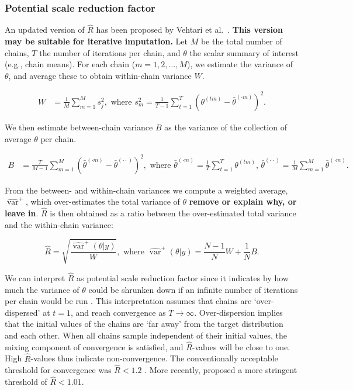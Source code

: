 \documentclass[Royal,times,sageh]{sagej}
\begin{document}
\hypertarget{potential-scale-reduction-factor}{%
\subsubsection{Potential scale reduction factor}\label{potential-scale-reduction-factor}}

An updated version of \(\widehat{R}\) has been proposed by Vehtari et al.~\citeyearpar[p.~5]{veht19}. \textbf{This version may be suitable for iterative imputation.} Let \(M\) be the total number of chains, \(T\) the number of iterations per chain, and \(\theta\) the scalar summary of interest (e.g., chain means). For each chain (\(m = 1, 2, \dots, M\)), we estimate the variance of \(\theta\), and average these to obtain within-chain variance \(W\).

\begin{align*}
W&=\frac{1}{M} \sum_{m=1}^{M} s_{j}^{2}, \text { where } s_{m}^{2}=\frac{1}{T-1} \sum_{t=1}^{T}\left(\theta^{(t m)}-\bar{\theta}^{(\cdot m)}\right)^{2}. 
\end{align*}

We then estimate between-chain variance \(B\) as the variance of the collection of average \(\theta\) per chain.

\begin{align*}
B&=\frac{T}{M-1} \sum_{m=1}^{M}\left(\bar{\theta}^{(\cdot m)}-\bar{\theta}^{(\cdot \cdot)}\right)^{2}, \text { where } \bar{\theta}^{(\cdot m)}=\frac{1}{T} \sum_{t=1}^{T} \theta^{(t m)} \text{, } \bar{\theta}^{(\cdot \cdot)}=\frac{1}{M} \sum_{m=1}^{M} \bar{\theta}^{(\cdot m)}. 
\end{align*}

From the between- and within-chain variances we compute a weighted average, \(\widehat{\operatorname{var}}^{+}\), which over-estimates the total variance of \(\theta\) \textbf{remove or explain why, or leave in}. \(\widehat{R}\) is then obtained as a ratio between the over-estimated total variance and the within-chain variance:

\begin{equation*}
\widehat{R}=\sqrt{\frac{\widehat{\operatorname{var}}^{+}(\theta | y)}{W}},
\text{ where } \widehat{\operatorname{var}}^{+}(\theta | y)=\frac{N-1}{N} W+\frac{1}{N} B.
\end{equation*}

We can interpret \(\widehat{R}\) as potential scale reduction factor since it indicates by how much the variance of \(\theta\) could be shrunken down if an infinite number of iterations per chain would be run \citep{gelm92}. This interpretation assumes that chains are `over-dispersed' at \(t=1\), and reach convergence as \(T \to \infty\). Over-dispersion implies that the initial values of the chains are `far away' from the target distribution and each other. When all chains sample independent of their initial values, the mixing component of convergence is satisfied, and \(\widehat{R}\)-values will be close to one. High \(\widehat{R}\)-values thus indicate non-convergence. The conventionally acceptable threshold for convergence was \(\widehat{R} < 1.2\) \citep{gelm92}. More recently, \citet{veht19} proposed a more stringent threshold of \(\widehat{R} < 1.01\).
\end{document}

